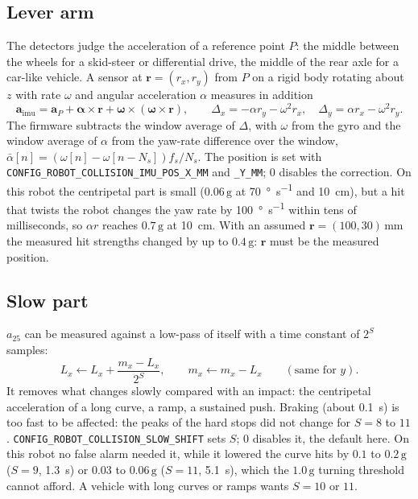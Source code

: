 \documentclass[11pt,a4paper]{article}
\newcommand{\g}{\,\mathrm{g}}
\newcommand{\code}[1]{\texttt{#1}}
\newcommand{\azf}{a_{25}}
\begin{document}
\subsection{Lever arm}

The detectors judge the acceleration of a reference point $P$: the middle between the wheels
for a skid-steer or differential drive, the middle of the rear axle for a car-like vehicle. A
sensor at $\mathbf{r} = (r_x, r_y)$ from $P$ on a rigid body rotating about $z$ with rate
$\omega$ and angular acceleration $\alpha$ measures in addition
\begin{equation}
  \mathbf{a}_\text{imu} = \mathbf{a}_P + \boldsymbol{\alpha} \times \mathbf{r}
    + \boldsymbol{\omega} \times (\boldsymbol{\omega} \times \mathbf{r}), \qquad
  \Delta_x = -\alpha r_y - \omega^2 r_x, \quad \Delta_y = \alpha r_x - \omega^2 r_y .
\end{equation}
The firmware subtracts the window average of $\Delta$, with $\omega$ from the gyro and the
window average of $\alpha$ from the yaw-rate difference over the window,
$\bar\alpha[n] = (\omega[n] - \omega[n-N_s]) f_s / N_s$. The position is set with
\code{CONFIG\_ROBOT\_COLLISION\_IMU\_POS\_X\_MM} and \code{\_Y\_MM}; 0 disables the
correction. On this robot the centripetal part is small ($0.06\g$ at
\SI{70}{\degree\per\second} and \SI{10}{\centi\metre}), but a hit that twists the robot changes
the yaw rate by \SI{100}{\degree\per\second} within tens of milliseconds, so $\alpha r$
reaches $0.7\g$ at \SI{10}{\centi\metre}. With an assumed $\mathbf{r} = (100, 30)$\,mm the
measured hit strengths changed by up to $0.4\g$: $\mathbf{r}$ must be the measured position.

\subsection{Slow part}
\label{sec:slow}

$\azf$ can be measured against a low-pass of itself with a time constant of $2^S$ samples:
\begin{equation}
  L_x \leftarrow L_x + \frac{m_x - L_x}{2^S}, \qquad m_x \leftarrow m_x - L_x
  \qquad (\text{same for } y).
\end{equation}
It removes what changes slowly compared with an impact: the centripetal acceleration of a long
curve, a ramp, a sustained push. Braking (about \SI{0.1}{\second}) is too fast to be affected:
the peaks of the hard stops did not change for $S = 8$ to $11$.
\code{CONFIG\_ROBOT\_COLLISION\_SLOW\_SHIFT} sets $S$; 0 disables it, the default here. On this
robot no false alarm needed it, while it lowered the curve hits by $0.1$ to $0.2\g$ ($S = 9$,
\SI{1.3}{\second}) or $0.03$ to $0.06\g$ ($S = 11$, \SI{5.1}{\second}), which the $1.0\g$
turning threshold cannot afford. A vehicle with long curves or ramps wants $S = 10$ or $11$.
\end{document}
